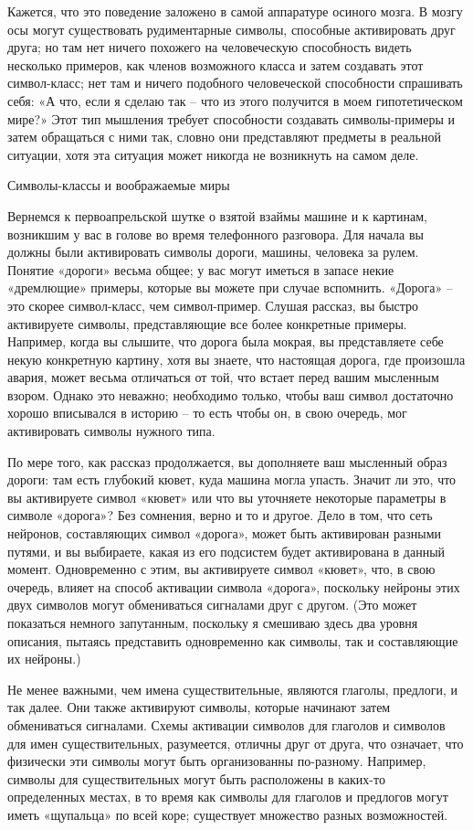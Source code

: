 \documentclass[../main.tex]{subfiles}
\begin{document}
Кажется, что это поведение заложено в самой аппаратуре осиного мозга. В мозгу осы могут существовать рудиментарные символы, способные активировать друг друга; но там нет ничего похожего на человеческую способность видеть несколько примеров, как членов возможного класса и затем создавать этот символ-класс; нет там и ничего подобного человеческой способности спрашивать себя: «А что, если я сделаю так \--- что из этого получится в моем гипотетическом мире?» Этот тип мышления требует способности создавать символы-примеры и затем обращаться с ними так, словно они представляют предметы в реальной ситуации, хотя эта ситуация может никогда не возникнуть на самом деле.

Символы-классы и воображаемые миры

Вернемся к первоапрельской шутке о взятой взаймы машине и к картинам, возникшим у вас в голове во время телефонного разговора. Для начала вы должны были активировать символы дороги, машины, человека за рулем. Понятие «дороги» весьма общее; у вас могут иметься в запасе некие «дремлющие» примеры, которые вы можете при случае вспомнить. «Дорога» \--- это скорее символ-класс, чем символ-пример. Слушая рассказ, вы быстро активируете символы, представляющие все более конкретные примеры. Например, когда вы слышите, что дорога была мокрая, вы представляете себе некую конкретную картину, хотя вы знаете, что настоящая дорога, где произошла авария, может весьма отличаться от той, что встает перед вашим мысленным взором. Однако это неважно; необходимо только, чтобы ваш символ достаточно хорошо вписывался в историю \--- то есть чтобы он, в свою очередь, мог активировать символы нужного типа.

По мере того, как рассказ продолжается, вы дополняете ваш мысленный образ дороги: там есть глубокий кювет, куда машина могла упасть. Значит ли это, что вы активируете символ «кювет» или что вы уточняете некоторые параметры в символе «дорога»? Без сомнения, верно и то и другое. Дело в том, что сеть нейронов, составляющих символ «дорога», может быть активирован разными путями, и вы выбираете, какая из его подсистем будет активирована в данный момент. Одновременно с этим, вы активируете символ «кювет», что, в свою очередь, влияет на способ активации символа «дорога», поскольку нейроны этих двух символов могут обмениваться сигналами друг с другом. (Это может показаться немного запутанным, поскольку я смешиваю здесь два уровня описания, пытаясь представить одновременно как символы, так и составляющие их нейроны.)

Не менее важными, чем имена существительные, являются глаголы, предлоги, и так далее. Они также активируют символы, которые начинают затем обмениваться сигналами. Схемы активации символов для глаголов и символов для имен существительных, разумеется, отличны друг от друга, что означает, что физически эти символы могут быть организованны по-разному. Например, символы для существительных могут быть расположены в каких-то определенных местах, в то время как символы для глаголов и предлогов могут иметь «щупальца» по всей коре; существует множество разных возможностей.
\end{document}
